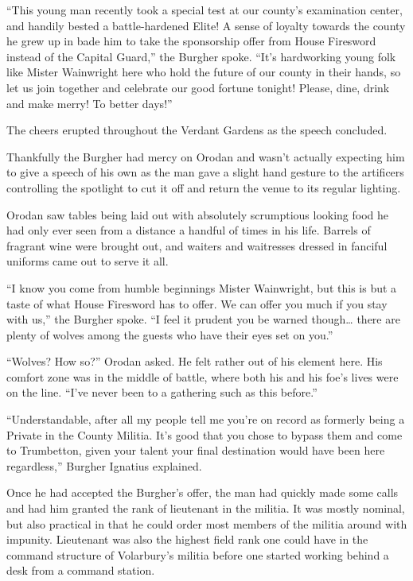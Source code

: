 \documentclass[a4paper,10pt]{book}
\begin{document}
“This young man recently took a special test at our county’s examination center, and handily bested a battle-hardened Elite! A sense of loyalty towards the county he grew up in bade him to take the sponsorship offer from House Firesword instead of the Capital Guard,” the Burgher spoke. “It’s hardworking young folk like Mister Wainwright here who hold the future of our county in their hands, so let us join together and celebrate our good fortune tonight! Please, dine, drink and make merry! To better days!”\par
The cheers erupted throughout the Verdant Gardens as the speech concluded.\par
Thankfully the Burgher had mercy on Orodan and wasn’t actually expecting him to give a speech of his own as the man gave a slight hand gesture to the artificers controlling the spotlight to cut it off and return the venue to its regular lighting.\par
Orodan saw tables being laid out with absolutely scrumptious looking food he had only ever seen from a distance a handful of times in his life. Barrels of fragrant wine were brought out, and waiters and waitresses dressed in fanciful uniforms came out to serve it all.\par
“I know you come from humble beginnings Mister Wainwright, but this is but a taste of what House Firesword has to offer. We can offer you much if you stay with us,” the Burgher spoke. “I feel it prudent you be warned though… there are plenty of wolves among the guests who have their eyes set on you.”\par
“Wolves? How so?” Orodan asked. He felt rather out of his element here. His comfort zone was in the middle of battle, where both his and his foe’s lives were on the line. “I’ve never been to a gathering such as this before.”\par
“Understandable, after all my people tell me you’re on record as formerly being a Private in the County Militia. It’s good that you chose to bypass them and come to Trumbetton, given your talent your final destination would have been here regardless,” Burgher Ignatius explained.\par
Once he had accepted the Burgher’s offer, the man had quickly made some calls and had him granted the rank of lieutenant in the militia. It was mostly nominal, but also practical in that he could order most members of the militia around with impunity. Lieutenant was also the highest field rank one could have in the command structure of Volarbury’s militia before one started working behind a desk from a command station.\par
\end{document}
